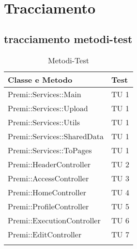 \section{Tracciamento}
\subsection{tracciamento metodi-test}
\begin{center}
\bgroup
\def\arraystretch{1.5}
\begin{longtable}{ | p{12cm} | p{2cm} | }
\hline
\cellcolor[gray]{0.9} \textbf{Classe e Metodo} & \cellcolor[gray]{0.9} \textbf{Test}
 \\ \hline
Premi::Services::Main & TU 1 \\ \hline 
Premi::Services::Upload & TU 1 \\ \hline
Premi::Services::Utils  & TU 1 \\ \hline
Premi::Services::SharedData & TU 1 \\ \hline
Premi::Services::ToPages & TU 1 \\ \hline
Premi::HeaderController & TU 2 \\ \hline
Premi::AccessController & TU 3 \\ \hline
Premi::HomeController & TU 4\\ \hline
Premi::ProfileController & TU 5 \\ \hline
Premi::ExecutionController & TU 6 \\ \hline
Premi::EditController & TU 7 \\ \hline

\caption{Metodi-Test}
\end{longtable}
\egroup
\end{center}